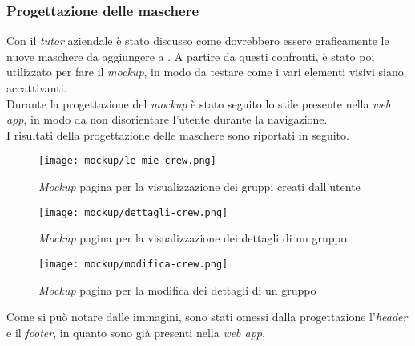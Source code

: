 \subsubsection{Progettazione delle maschere}
Con il \textit{tutor} aziendale è stato discusso come dovrebbero essere graficamente le nuove maschere da aggiungere a \productName. A partire da questi confronti, è stato poi utilizzato  per fare il \textit{mockup}, in modo da  testare come i vari elementi visivi siano accattivanti.\\
Durante la progettazione del \textit{mockup} è stato seguito lo stile presente nella \textit{web app}, in modo da non disorientare l'utente durante la navigazione. \\
I risultati della progettazione delle maschere sono riportati in seguito.
\begin{figure}[H] 
    \centerline{\texttt{[image: mockup/le-mie-crew.png]}} 
    \caption{\textit{Mockup} pagina per la visualizzazione dei gruppi creati dall'utente}
\end{figure}


\begin{figure}[H] 
    \centering 
    \texttt{[image: mockup/dettagli-crew.png]} 
    \caption{\textit{Mockup} pagina per la visualizzazione dei dettagli di un gruppo}
\end{figure}

\begin{figure}[H] 
    \centering 
    \texttt{[image: mockup/modifica-crew.png]} 
    \caption{\textit{Mockup} pagina per la modifica dei dettagli di un gruppo}
\end{figure}

Come si può notare dalle immagini, sono stati omessi dalla progettazione l'\textit{header} e il \textit{footer}, in quanto sono già presenti nella \textit{web app}.





